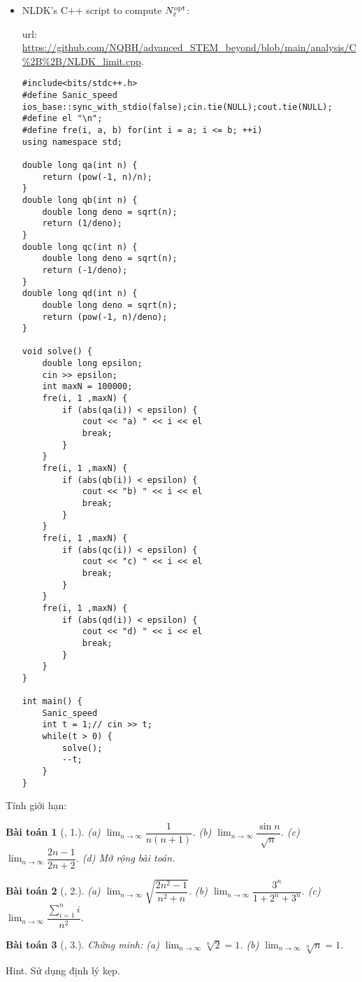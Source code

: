 \documentclass{article}
\newtheorem{baitoan}{Bài toán}
\begin{document}
\begin{itemize}
	\item NLDK's C++ script to compute $N_\varepsilon^{\rm opt}$:
	
	{\sc url}: \url{https://github.com/NQBH/advanced_STEM_beyond/blob/main/analysis/C%2B%2B/NLDK_limit.cpp}.
	\begin{verbatim}
#include<bits/stdc++.h>
#define Sanic_speed ios_base::sync_with_stdio(false);cin.tie(NULL);cout.tie(NULL);
#define el "\n";
#define fre(i, a, b) for(int i = a; i <= b; ++i)
using namespace std;

double long qa(int n) {
    return (pow(-1, n)/n);
}
double long qb(int n) {
    double long deno = sqrt(n);
    return (1/deno);
}
double long qc(int n) {
    double long deno = sqrt(n);
    return (-1/deno);
}
double long qd(int n) {
    double long deno = sqrt(n);
    return (pow(-1, n)/deno);
}

void solve() {
    double long epsilon;
    cin >> epsilon;
    int maxN = 100000;
    fre(i, 1 ,maxN) {
        if (abs(qa(i)) < epsilon) {
            cout << "a) " << i << el
            break;
        }
    }
    fre(i, 1 ,maxN) {
        if (abs(qb(i)) < epsilon) {
            cout << "b) " << i << el
            break;
        }
    }
    fre(i, 1 ,maxN) {
        if (abs(qc(i)) < epsilon) {
            cout << "c) " << i << el
            break;
        }
    }
    fre(i, 1 ,maxN) {
        if (abs(qd(i)) < epsilon) {
            cout << "d) " << i << el
            break;
        }
    }
}

int main() {
    Sanic_speed
    int t = 1;// cin >> t;
    while(t > 0) {
    	solve();
    	--t;
   	}
}
	\end{verbatim}
\end{itemize}
Tính giới hạn:

\begin{baitoan}[\cite{TLCT_dai_so_giai_tich_11}, 1.]
	(a) $\lim_{n\to\infty} \dfrac{1}{n(n + 1)}$. (b) $\lim_{n\to\infty} \dfrac{\sin n}{\sqrt{n}}$. (c) $\lim_{n\to\infty} \dfrac{2n - 1}{2n + 2}$. (d) Mở rộng bài toán.
\end{baitoan}

\begin{baitoan}[\cite{TLCT_dai_so_giai_tich_11}, 2.]
	(a) $\lim_{n\to\infty} \sqrt{\dfrac{2n^2 - 1}{n^2 + n}}$. (b) $\lim_{n\to\infty} \dfrac{3^n}{1 + 2^n + 3^n}$. (c) $\lim_{n\to\infty} \dfrac{\sum_{i=1}^n i}{n^2}$.
\end{baitoan}

\begin{baitoan}[\cite{TLCT_dai_so_giai_tich_11}, 3.]
	Chứng minh: (a) $\lim_{n\to\infty} \sqrt[n]{2} = 1$. (b) $\lim_{n\to\infty} \sqrt[n]{n} = 1$. 
\end{baitoan}
{\sf Hint.} Sử dụng định lý kẹp.
\end{document}
